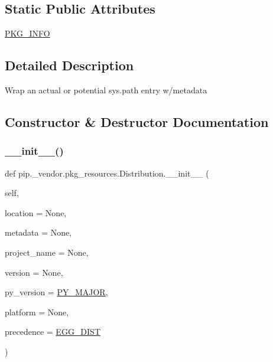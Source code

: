 \subsection*{Static Public Attributes}
\begin{DoxyCompactItemize}
\item 
\hyperlink{classpip_1_1__vendor_1_1pkg__resources_1_1Distribution_a3d1b19ceaeee58ab640ceff61d84d503}{P\+K\+G\+\_\+\+I\+N\+FO}
\end{DoxyCompactItemize}


\subsection{Detailed Description}
\begin{DoxyVerb}Wrap an actual or potential sys.path entry w/metadata\end{DoxyVerb}
 

\subsection{Constructor \& Destructor Documentation}
\mbox{\label{classpip_1_1__vendor_1_1pkg__resources_1_1Distribution_acc88f1c6cf64526416b99b70c5bb0bd5}} 
\subsubsection{\texorpdfstring{\+\_\+\+\_\+init\+\_\+\+\_\+()}{\_\_init\_\_()}}
{\footnotesize\ttfamily def pip.\+\_\+vendor.\+pkg\+\_\+resources.\+Distribution.\+\_\+\+\_\+init\+\_\+\+\_\+ (\begin{DoxyParamCaption}\item[{}]{self,  }\item[{}]{location = {\ttfamily None},  }\item[{}]{metadata = {\ttfamily None},  }\item[{}]{project\+\_\+name = {\ttfamily None},  }\item[{}]{version = {\ttfamily None},  }\item[{}]{py\+\_\+version = {\ttfamily \hyperlink{namespacepip_1_1__vendor_1_1pkg__resources_acca7e38274a92063eabc8c2b739d5ca4}{P\+Y\+\_\+\+M\+A\+J\+OR}},  }\item[{}]{platform = {\ttfamily None},  }\item[{}]{precedence = {\ttfamily \hyperlink{namespacepip_1_1__vendor_1_1pkg__resources_a2d337406bae844cdf2c7ed99345eb6b3}{E\+G\+G\+\_\+\+D\+I\+ST}} }\end{DoxyParamCaption})}



